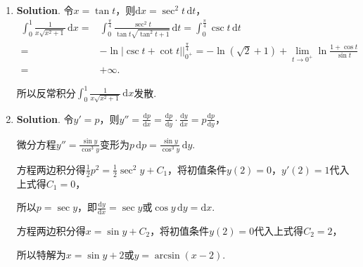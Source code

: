 \documentclass[../Main.tex]{subfiles}
\begin{document}
\begin{enumerate}
    \item \textbf{Solution}. 令$x=\tan t$，则$\mathrm{d}x=\sec^{2} t\,\mathrm{d}
              t$，
          \[
              \begin{aligned}
                  \int_{0}^{1}\frac{1}{x\sqrt{x^2+1}}\,\mathrm{d}x = & \int_{0}^{\frac{\pi}{4}}\frac{\sec^2 t}{\tan t\sqrt{\tan^2 t+1}}\,\mathrm{d}t = \int_{0}^{\frac{\pi}{4}}\csc t\,\mathrm{d}t \\
                  =                                                  & -\ln|\csc t+\cot t|\bigg|_{0^+}^{\frac{\pi}{4}}= -\ln(\sqrt{2}+1)+\lim_{t\to0^+}\ln\frac{1+\cos t}{\sin t}                  \\
                  =                                                  & +\infty.
              \end{aligned}
          \]

          所以反常积分$\int_{0}^{1}\frac{1}{x\sqrt{x^{2}+1}}\,\mathrm{d}x$发散.

    \item \textbf{Solution}. 令$y'=p$，则$y''=\frac{\mathrm{d}p}{\mathrm{d}x}
              =\frac{\mathrm{d}p}{\mathrm{d}y}\cdot \frac{\mathrm{d}y}{\mathrm{d}x}=p\frac{\mathrm{d}p}{\mathrm{d}y}$，

          微分方程$y''=\frac{\sin y}{\cos^{3} y}$变形为$p\,\mathrm{d}p=\frac{\sin y}{\cos^{3}
                  y}\,\mathrm{d}y$.

          方程两边积分得$\frac{1}{2}p^{2}=\frac{1}{2}\sec^{2} y+C_{1}$，将初值条件$y(
              2)=0$，$y'(2)=1$代入上式得$C_{1}=0$，

          所以$p=\sec y$，即$\frac{\mathrm{d}y}{\mathrm{d}x}=\sec y$或$\cos y\,\mathrm{d}
              y=\mathrm{d}x$.

          方程两边积分得$x=\sin y+C_{2}$，将初值条件$y(2)=0$代入上式得$C_{2}=2$，

          所以特解为$x=\sin y+2$或$y=\arcsin(x-2)$.
\end{enumerate}
\end{document}
